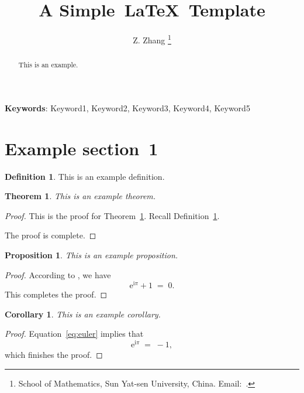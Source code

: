 \documentclass[12pt,a4paper,draft]{article}  %
\title{A Simple~\LaTeX~Template}
\date{\DTMnow}
\author{
Z. Zhang
\thanks{
School of Mathematics, Sun Yat-sen University, China. Email:~\email{zhangzaikun@mail.sysu.edu.cn}.
}
}
\newcounter{cite}
\newcommand{\todo}[1]{}
\newtheorem{theorem}{Theorem}[section]
\newtheorem{corollary}{Corollary}[section]
\newtheorem{proposition}{Proposition}[section]
\theoremstyle{definition}
\newtheorem{definition}{Definition}[section]
\numberwithin{equation}{section}
\newcommand{\me}{\mathrm{e}}
\newcommand{\mi}{\mathrm{i}}
\begin{document}
\maketitle

\begin{abstract}
  This is an example.
\end{abstract}

\textbf{Keywords}: Keyword1, Keyword2, Keyword3, Keyword4, Keyword5




\section{Example section~1}
\label{sec:example1}

\begin{definition}
  \label{def:example}
  This is an example definition.
\end{definition}

\begin{theorem}
  \label{thm:example}
  This is an example theorem.
\end{theorem}

\begin{proof}
  This is the proof for Theorem~\ref{thm:example}.
  Recall Definition~\ref{def:example}.
  \todo{An example for TODO.}
  The proof is complete.
\end{proof}

\begin{proposition}
  \label{prop:example}
  This is an example proposition.
\end{proposition}

\begin{proof}
According to \cite[Theorem~3.14]{Jordan_1874}, we have
\begin{equation}
  \label{eq:euler}
  \me^{\mi \pi} + 1 \;=\; 0.
\end{equation}
This completes the proof.
\end{proof}

\begin{corollary}
  \label{coro:example}
  This is an example corollary.
\end{corollary}

\begin{proof}
Equation~\eqref{eq:euler} implies that
\begin{equation*}
  \me^{\mi \pi} \;=\; -1,
\end{equation*}
which finishes the proof.
\end{proof}
\end{document}
